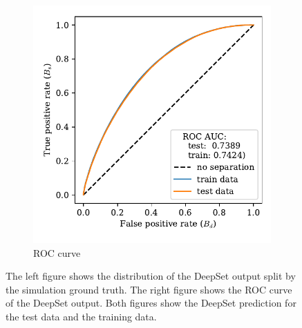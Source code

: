 \begin{figure}
\begin{subfigure}{0.5\textwidth}
        \includegraphics[width=\textwidth]{images/B_ROC.pdf}
        \caption{ROC curve}
        \label{fig:B_ROC}
    \end{subfigure}%
    \caption{The left figure shows the distribution of the DeepSet output split by the simulation ground truth. The right figure shows the ROC curve of the DeepSet output. Both figures show the DeepSet prediction for the test data and the training data.}
    \label{fig:B_eval}
\end{figure}
